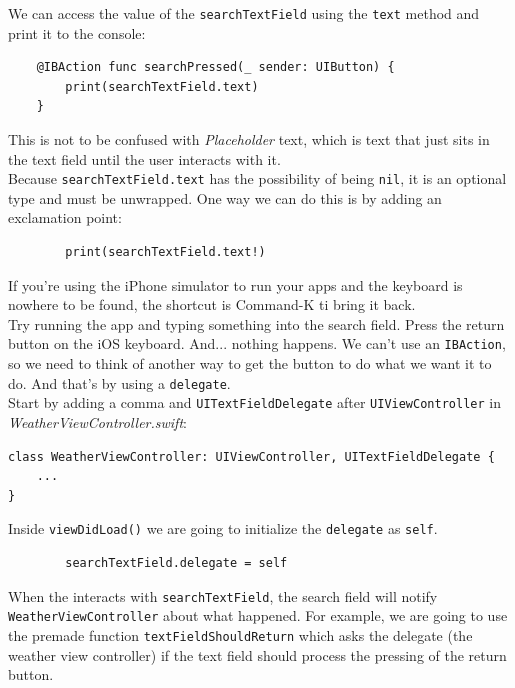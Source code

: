 \documentclass[12pt, letterpaper]{article}
\begin{document}
We can access the value of the \verb+searchTextField+ using the \verb+text+ method and print it to the console:

\begin{verbatim}
    @IBAction func searchPressed(_ sender: UIButton) {
        print(searchTextField.text)
    }
\end{verbatim}

This is not to be confused with \emph{Placeholder} text, which is text that just sits in the text field until the user
interacts with it. \\

Because \verb+searchTextField.text+ has the possibility of being \verb+nil+, it is an optional type and must be unwrapped.
One way we can do this is by adding an exclamation point:

\begin{verbatim}
        print(searchTextField.text!)
\end{verbatim}

If you're using the iPhone simulator to run your apps and the keyboard is nowhere to be found, the shortcut is Command-K ti
bring it back. \\

Try running the app and typing something into the search field. Press the return button on the iOS keyboard. And... nothing
happens. We can't use an \verb+IBAction+, so we need to think of another way to get the button to do what we want it to do.
And that's by using a \verb+delegate+. \\

Start by adding a comma and \verb+UITextFieldDelegate+ after \verb+UIViewController+ in \emph{WeatherViewController.swift}:

\begin{verbatim}
class WeatherViewController: UIViewController, UITextFieldDelegate {
    ...
}
\end{verbatim}

Inside \verb+viewDidLoad()+ we are going to initialize the \verb+delegate+ as \verb+self+. 

\begin{verbatim}
        searchTextField.delegate = self
\end{verbatim}

When the interacts with \verb+searchTextField+, the search field will notify \verb+WeatherViewController+ about what happened.
For example, we are going to use the premade function \newline \verb+textFieldShouldReturn+ which asks the delegate
(the weather view controller) if the text field should process the pressing of the return button. \\
\end{document}
